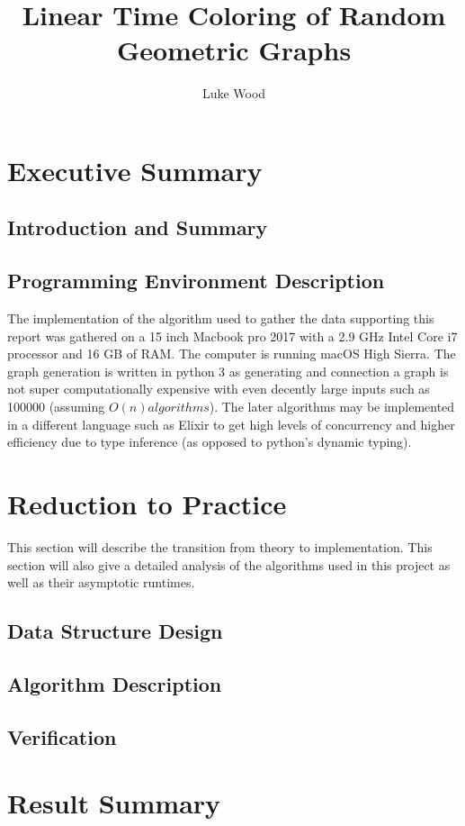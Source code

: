 \documentclass{article}
\begin{document}
  \title{Linear Time Coloring of Random Geometric Graphs}
  \author{Luke Wood}
  \maketitle

  \section{Executive Summary}
    \subsection{Introduction and Summary}
    \subsection{Programming Environment Description}
  		The implementation of the algorithm used to gather the data supporting this report was gathered on a 15 inch Macbook pro 2017 with a 2.9 GHz Intel Core i7 processor and 16 GB of RAM.
  		The computer is running macOS High Sierra.
  		The graph generation is written in python 3 as generating and connection a graph is not super computationally expensive with even decently large inputs such as 100000 (assuming $O(n) algorithms$).
  		The later algorithms may be implemented in a different language such as Elixir to get high levels of concurrency and higher efficiency due to type inference (as opposed to python's dynamic typing).
  \section{Reduction to Practice}
      This section will describe the transition from theory to implementation.
      This section will also give a detailed analysis of the algorithms used in this project as well as their asymptotic runtimes.
  	\subsection{Data Structure Design}
  	\subsection{Algorithm Description}
  	\subsection{Verification}
  \section{Result Summary}
  \printbibliography
\end{document}
